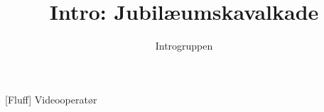 \documentclass[a4paper,11pt]{article}
\title{Intro: Jubilæumskavalkade}
\author{Introgruppen}
\begin{document}
\maketitle

\begin{roles}
[Fluff] Videooperatør
\end{roles}

\begin{sketch}

\end{sketch}
\end{document}
